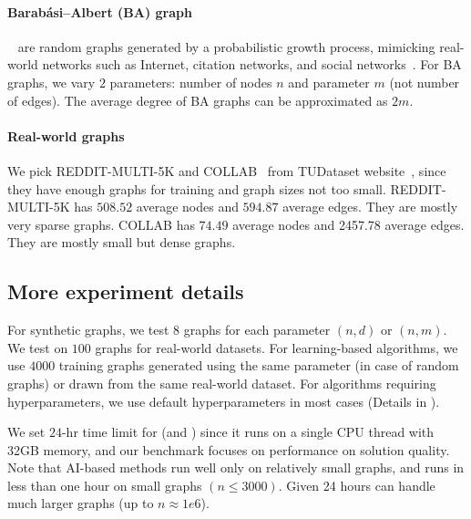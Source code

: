 \paragraph{Barab\'asi–Albert (BA) graph}
~\citep{albert2002statistical} are random graphs generated by a probabilistic growth process,
mimicking real-world networks such as Internet, citation networks, and social networks~\citep{albert2002statistical, radicchi2011citation}.
For BA graphs, we vary $2$ parameters: number of nodes $n$ and parameter $m$ (not number of edges). The average degree of BA graphs can be approximated as $2m$.

\paragraph{Real-world graphs}
We pick REDDIT-MULTI-5K and COLLAB~\citep{yanardag2015deep} from TUDataset website~\citep{Morris+2020}, since they have enough graphs for training and graph sizes not too small. 
REDDIT-MULTI-5K has $508.52$ average nodes and $594.87$ average edges. They are mostly very sparse graphs. COLLAB has $74.49$ average nodes and 2457.78 average edges. They are mostly small but dense graphs.

\subsection{More experiment details}\label{sec:exp-details-sketch}
For synthetic graphs, we test $8$ graphs for each parameter $(n,d)$ or $(n,m)$. We test on $100$ graphs for real-world datasets. For learning-based algorithms, we use $4000$ training graphs generated using the same parameter (in case of random graphs)  or drawn from the same real-world dataset. For algorithms requiring hyperparameters, we use default hyperparameters in most cases (Details in ).

We set $24$-hr time limit for \kamis (\onlinemis and \redumis) since it runs on a single CPU thread with 32GB memory, and our benchmark focuses on performance on solution quality. Note that AI-based methods run well only on relatively small graphs, and \redumis runs in less than one hour on small graphs $(n \leq 3000)$. Given 24 hours \redumis can handle much larger graphs (up to $n\approx 1e6$).

